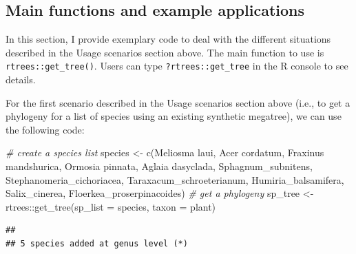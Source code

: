 \documentclass[
  12pt,
]{article}
\newenvironment{Shaded}{\begin{snugshade}}{\end{snugshade}}
\newcommand{\AttributeTok}[1]{\textcolor[rgb]{0.77,0.63,0.00}{#1}}
\newcommand{\CommentTok}[1]{\textcolor[rgb]{0.56,0.35,0.01}{\textit{#1}}}
\newcommand{\FunctionTok}[1]{\textcolor[rgb]{0.00,0.00,0.00}{#1}}
\newcommand{\NormalTok}[1]{#1}
\newcommand{\OtherTok}[1]{\textcolor[rgb]{0.56,0.35,0.01}{#1}}
\newcommand{\SpecialCharTok}[1]{\textcolor[rgb]{0.00,0.00,0.00}{#1}}
\newcommand{\StringTok}[1]{\textcolor[rgb]{0.31,0.60,0.02}{#1}}
\begin{document}
\hypertarget{main-functions-and-example-applications}{%
\subsection{Main functions and example applications}\label{main-functions-and-example-applications}}

In this section, I provide exemplary code to deal with the different situations described in the Usage scenarios section above. The main function to use is \texttt{rtrees::get\_tree()}. Users can type \texttt{?rtrees::get\_tree} in the R console to see details.

For the first scenario described in the Usage scenarios section above (i.e., to get a phylogeny for a list of species using an existing synthetic megatree), we can use the following code:

\begin{Shaded}
\begin{Highlighting}[]
\CommentTok{\# create a species list}
\NormalTok{species }\OtherTok{\textless{}{-}} \FunctionTok{c}\NormalTok{(}\StringTok{\textquotesingle{}Meliosma laui\textquotesingle{}}\NormalTok{, }\StringTok{\textquotesingle{}Acer cordatum\textquotesingle{}}\NormalTok{, }\StringTok{\textquotesingle{}Fraxinus mandshurica\textquotesingle{}}\NormalTok{,}
            \StringTok{\textquotesingle{}Ormosia pinnata\textquotesingle{}}\NormalTok{, }\StringTok{\textquotesingle{}Aglaia dasyclada\textquotesingle{}}\NormalTok{, }\StringTok{\textquotesingle{}Sphagnum\_subnitens\textquotesingle{}}\NormalTok{,}
            \StringTok{\textquotesingle{}Stephanomeria\_cichoriacea\textquotesingle{}}\NormalTok{, }\StringTok{\textquotesingle{}Taraxacum\_schroeterianum\textquotesingle{}}\NormalTok{, }
            \StringTok{\textquotesingle{}Humiria\_balsamifera\textquotesingle{}}\NormalTok{, }\StringTok{\textquotesingle{}Salix\_cinerea\textquotesingle{}}\NormalTok{, }\StringTok{\textquotesingle{}Floerkea\_proserpinacoides\textquotesingle{}}\NormalTok{)}
\CommentTok{\# get a phylogeny}
\NormalTok{sp\_tree }\OtherTok{\textless{}{-}}\NormalTok{ rtrees}\SpecialCharTok{::}\FunctionTok{get\_tree}\NormalTok{(}\AttributeTok{sp\_list =}\NormalTok{ species, }\AttributeTok{taxon =} \StringTok{\textquotesingle{}plant\textquotesingle{}}\NormalTok{)}
\end{Highlighting}
\end{Shaded}

\begin{verbatim}
## 
## 5 species added at genus level (*)
\end{verbatim}
\end{document}
